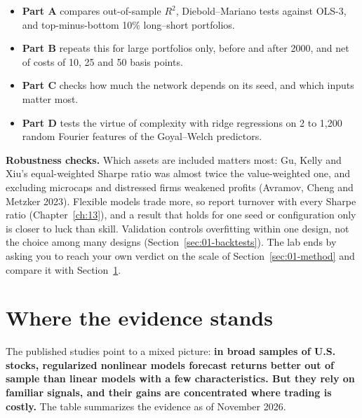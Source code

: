 \begin{itemize}
  \item \textbf{Part A} compares out-of-sample $R^2$, Diebold--Mariano tests against OLS-3, and top-minus-bottom 10\% long--short portfolios.
  \item \textbf{Part B} repeats this for large portfolios only, before and after 2000, and net of costs of 10, 25 and 50 basis points.
  \item \textbf{Part C} checks how much the network depends on its seed, and which inputs matter most.
  \item \textbf{Part D} tests the virtue of complexity with ridge regressions on 2 to 1,200 random Fourier features of the Goyal--Welch predictors.
\end{itemize}

\label{sec:20-stress}
\textbf{Robustness checks.} Which assets are included matters most: Gu, Kelly and Xiu's equal-weighted Sharpe ratio was almost twice the value-weighted one, and excluding microcaps and distressed firms weakened profits (Avramov, Cheng and Metzker 2023). Flexible models trade more, so report turnover with every Sharpe ratio (Chapter~\ref{ch:13}), and a result that holds for one seed or configuration only is closer to luck than skill. Validation controls overfitting within one design, not the choice among many designs (Section~\ref{sec:01-backtests}). The lab ends by asking you to reach your own verdict on the scale of Section~\ref{sec:01-method} and compare it with Section~\ref{sec:20-verdict}.

\section{Where the evidence stands}
\label{sec:20-verdict}

The published studies point to a mixed picture: \textbf{in broad samples of U.S. stocks, regularized nonlinear models forecast returns better out of sample than linear models with a few characteristics. But they rely on familiar signals, and their gains are concentrated where trading is costly.} The table summarizes the evidence as of November 2026.

